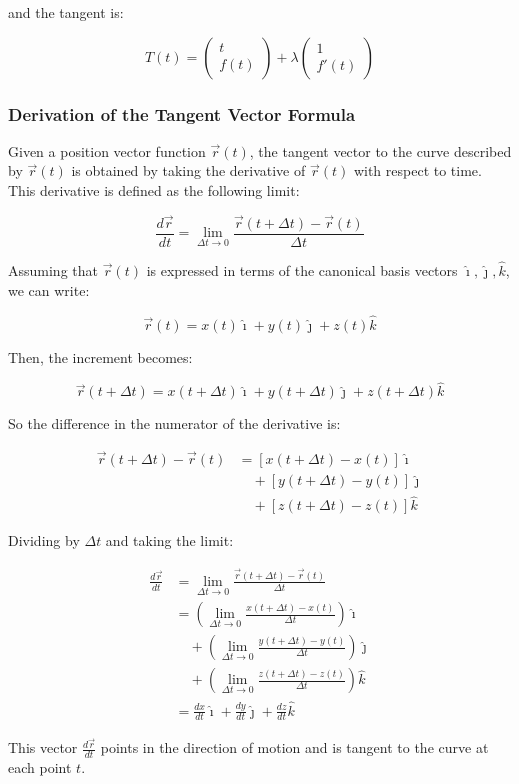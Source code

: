 and the tangent is:

\[
    T(t) = \begin{pmatrix}
        t \\ f(t)
    \end{pmatrix} + \lambda \begin{pmatrix}
        1 \\ f'(t)
    \end{pmatrix}
\]

\subsubsection{Derivation of the Tangent Vector Formula}

Given a position vector function \(\vec{r}(t)\), the tangent vector to the curve described by \(\vec{r}(t)\) is 
obtained by taking the derivative of \(\vec{r}(t)\) with respect to time. This derivative is defined as the following limit:

\[
    \frac{d\vec{r}}{dt} = \lim_{\Delta t \to 0} \frac{\vec{r}(t + \Delta t) - \vec{r}(t)}{\Delta t}
\]

Assuming that \(\vec{r}(t)\) is expressed in terms of the canonical basis vectors \(\hat{\imath}, \hat{\jmath}, \hat{k}\), 
we can write:

\[
    \vec{r}(t) = x(t)\hat{\imath} + y(t)\hat{\jmath} + z(t)\hat{k}
\]

Then, the increment becomes:

\[
    \vec{r}(t + \Delta t) = x(t + \Delta t)\hat{\imath} + y(t + \Delta t)\hat{\jmath} + z(t + \Delta t)\hat{k}
\]

So the difference in the numerator of the derivative is:

\begin{align*}
    \vec{r}(t + \Delta t) - \vec{r}(t) &= \left[x(t + \Delta t) - x(t)\right]\hat{\imath} \\
    &\quad + \left[y(t + \Delta t) - y(t)\right]\hat{\jmath} \\
    &\quad + \left[z(t + \Delta t) - z(t)\right]\hat{k}
\end{align*}

Dividing by \(\Delta t\) and taking the limit:

\begin{align*}
    \frac{d\vec{r}}{dt} &= \lim_{\Delta t \to 0} \frac{\vec{r}(t + \Delta t) - \vec{r}(t)}{\Delta t} \\
    &= \left( \lim_{\Delta t \to 0} \frac{x(t + \Delta t) - x(t)}{\Delta t} \right) \hat{\imath} \\
    &\quad + \left( \lim_{\Delta t \to 0} \frac{y(t + \Delta t) - y(t)}{\Delta t} \right) \hat{\jmath} \\
    &\quad + \left( \lim_{\Delta t \to 0} \frac{z(t + \Delta t) - z(t)}{\Delta t} \right) \hat{k} \\
    &= \frac{dx}{dt} \hat{\imath} + \frac{dy}{dt} \hat{\jmath} + \frac{dz}{dt} \hat{k}
\end{align*}

This vector \(\frac{d\vec{r}}{dt}\) points in the direction of motion and is tangent to the curve at each point \(t\).

